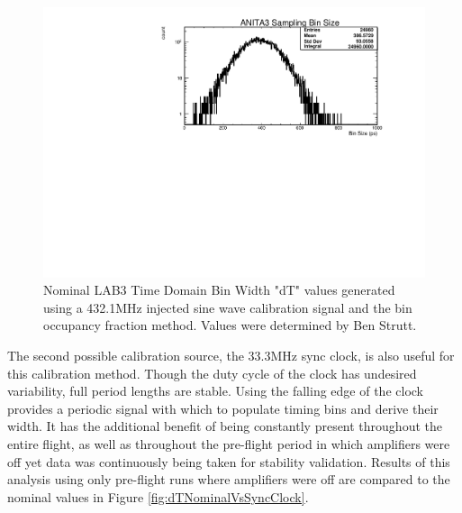 	
	\begin{figure}
		\includegraphics[width=\textwidth]{figures/dTNominal}
		\caption{Nominal LAB3 Time Domain Bin Width "dT" values generated using a 432.1MHz injected sine wave calibration signal and the bin occupancy fraction method.  Values were determined by Ben Strutt\cite{benSThesis}.}
		\label{fig:dTNominal}
	\end{figure}
		
		The second possible calibration source, the 33.3MHz sync clock, is also useful for this calibration method.  Though the duty cycle of the clock has undesired variability, full period lengths are stable.  Using the falling edge of the clock provides a periodic signal with which to populate timing bins and derive their width.  It has the additional benefit of being constantly present throughout the entire flight, as well as throughout the pre-flight period in which amplifiers were off yet data was continuously being taken for stability validation.  Results of this analysis using only pre-flight runs where amplifiers were off are compared to the nominal values in Figure \ref{fig:dTNominalVsSyncClock}.
		
